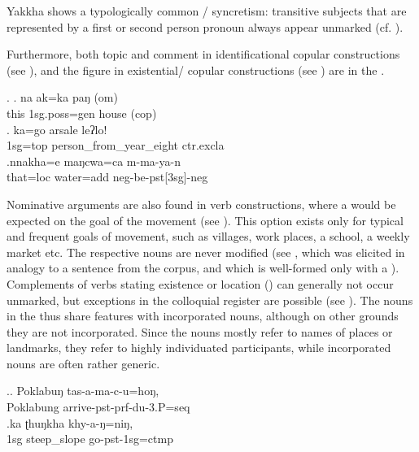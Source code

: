 Yakkha shows a typologically common / syncretism: transitive subjects that are represented by a first or second person pronoun always appear unmarked (cf. ).
	
Furthermore, both topic and comment in identificational copular constructions (see \Next), and  the figure in existential/ copular constructions (see \Next[c]) are in the .
	
\ex. \ag. na ak=ka paŋ (om)\\
		this {\sc 1sg.poss=gen} house ({\sc cop})\\
		\bg.   ka=go      arsale          leʔlo!\\
	{\sc 1sg=top} person\_from\_year\_eight {\sc ctr.excla}		\\
	 	
	\bg.nnakha=e    maŋcwa=ca        m-ma-ya-n\\
	that{\sc =loc}  water{\sc =add} {\sc neg-}be{\sc -pst[3sg]-neg}\\
	
Nominative arguments are also found in  verb constructions, where a  would be expected on the goal of the movement (see \Next). This option exists only for typical and frequent goals of movement, such as villages, work places, a school, a weekly market etc. The respective nouns are never modified (see \NNext[a], which was elicited in analogy to a sentence from the corpus, and which is well-formed only with a ). Complements of verbs stating existence or location () can generally not occur unmarked, but exceptions in the colloquial register are possible (see \NNext[b]). The nouns in the  thus share features with incorporated nouns, although on other grounds they are not incorporated. Since the nouns mostly refer to names of places or landmarks, they refer to highly individuated participants, while incorporated nouns are often rather generic. 

	
 	\ex.\ag. Poklabuŋ tas-a-ma-c-u=hoŋ, \\
	Poklabung{\sc [loc]} arrive{\sc -pst-prf-du-3.P=seq} 	\\
	 	
\bg.ka  ʈhuŋkha           khy-a-ŋ=niŋ,\\
{\sc 1sg} steep\_slope{\sc [loc]} go{\sc -pst-1sg=ctmp}\\

